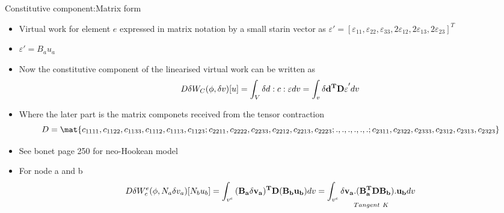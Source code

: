  
 	\begin{frame}{Constitutive component:Matrix form}
 		\begin{itemize}
 			\item Virtual work for element $e$ expressed in matrix notation by a small starin vector as 
 			$\varepsilon' = [\varepsilon_{11},\varepsilon_{22},\varepsilon_{33},2\varepsilon_{12},2\varepsilon_{13},2\varepsilon_{23}]^T$
 			\item $\varepsilon' = B_au_a$
 			\item Now the constitutive component of the linearised virtual work can be written as
 			\begin{equation}
 			D\delta W_C(\phi,\delta v)[u] = \int_V \delta d :c:\varepsilon dv = \int_v \delta \mathbf{d^TD\varepsilon}' dv
 			\end{equation}
 			\item Where the later part is the matrix componets received from the tensor contraction
 			\begin{equation}
 				D = \mat{c_{1111},c_{1122},c_{1133},c_{1112},c_{1113},c_{1123};
 						 c_{2211},c_{2222},c_{2233},c_{2212},c_{2213},c_{2223};
 						 .,.,.,.,.,.;
 					     c_{2311},c_{2322},c_{2333},c_{2312},c_{2313},c_{2323}}
 			\end{equation}
 			\item See bonet page 250 for neo-Hookean model
 			\item For node a and b
 			\begin{equation}
 				D\delta W_c^e(\phi,N_a\delta v_a)[N_b u_b] = \int_{v^e} \mathbf{(B_a \delta v_a)^TD(B_b u_b)} dv =  \underset{Tangent~ K}{\int_{v^e} \mathbf{\delta v_a.(B_a ^TDB_b ).u_b} dv}
 			\end{equation}
 		\end{itemize}
 	\end{frame}
 
